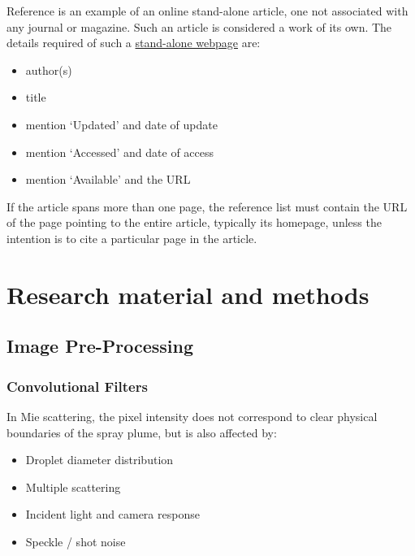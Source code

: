 \documentclass[english, 12pt, a4paper, elec, utf8, a-2b, online]{aaltothesis}
\begin{document}
\noindent
Reference \cite{webpage} is an example of an online stand-alone article, one not
associated with any journal or magazine. Such an article is considered a work of
its own. The details required of such a \underline{stand-alone webpage} 
are:
\begin{itemize}
\setlength{\itemsep}{-3pt}
\item[--] author(s)
\item[--] title
\item[--] mention `Updated' and date of update
\item[--] mention `Accessed' and date of access
\item[--] mention `Available' and the URL
\end{itemize}
If the article spans more than one page, the reference list must contain the URL
of the page pointing to the entire article, typically its homepage, unless the 
intention is to cite a particular page in the article.


\clearpage

\section{Research material and methods}

\subsection{Image Pre-Processing}
\subsubsection{Convolutional Filters}





In Mie scattering, the pixel intensity does not correspond to clear physical boundaries of the spray plume, but is also affected by:\\ 

\begin{itemize}
    \item Droplet diameter distribution
    \item Multiple scattering
    \item Incident light and camera response
    \item Speckle / shot noise
\end{itemize}\\
\end{document}
